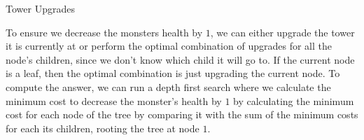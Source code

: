 \begin{tutorial}{Tower Upgrades}

To ensure we decrease the monsters health by $1$, we can either upgrade the tower it is currently at or perform the optimal combination of upgrades for all the node's children, since we don't know which child it will go to. If the current node is a leaf, then the optimal combination is just upgrading the current node. To compute the answer, we can run a depth first search where we calculate the minimum cost to decrease the monster's health by $1$ by calculating the minimum cost for each node of the tree by comparing it with the sum of the minimum costs for each its children, rooting the tree at node $1$.

\end{tutorial}
